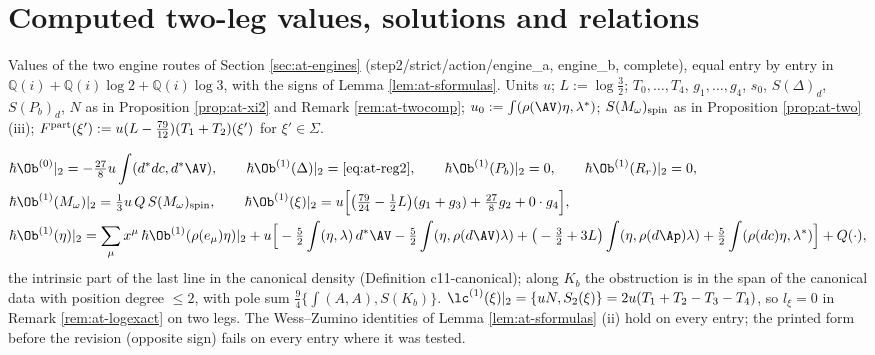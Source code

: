 \section{Computed two-leg values, solutions and relations}
\label{sec:at-computed}

Values of the two engine routes of Section \ref{sec:at-engines} (step2/strict/action/engine\_a, engine\_b, complete), equal entry by entry in $\mathbb Q(i)+\mathbb Q(i)\log2+\mathbb Q(i)\log3$, with the signs of Lemma \ref{lem:at-sformulas}. Units $u$; $L:=\log\tfrac32$; $T_0,\dots,T_4$, $g_1,\dots,g_4$, $s_0$, $S(\Delta)_d$, $S(P_b)_d$, $N$ as in Proposition \ref{prop:at-xi2} and Remark \ref{rem:at-twocomp}; $u_0:=\int(\rho(\AV)\eta,\lambda^*)$; $S(M_\omega)_{\rm spin}$ as in Proposition \ref{prop:at-two} (iii); $F^{\rm part}(\xi'):=u(L-\tfrac{79}{12})(T_1+T_2)(\xi')$ for $\xi'\in\Sigma$.

\begin{proposition}
\label{prop:at-c-ob1}
\[
\begin{aligned}
&\hbar\Ob^{(0)}|_2=-\tfrac{27}8u\int(d^*dc,d^*\AV),\qquad \hbar\Ob^{(1)}(\Delta)|_2=\eqref{eq:at-reg2},\qquad \hbar\Ob^{(1)}(P_b)|_2=0,\qquad \hbar\Ob^{(1)}(R_r)|_2=0,\\
&\hbar\Ob^{(1)}(M_\omega)|_2=\tfrac13u\,Q\,S(M_\omega)_{\rm spin},\qquad \hbar\Ob^{(1)}(\xi)|_2=u\Big[\big(\tfrac{79}{24}-\tfrac12L\big)(g_1+g_3)+\tfrac{27}8g_2+0\cdot g_4\Big],\\
&\hbar\Ob^{(1)}(\eta)|_2=\sum_\mu x^\mu\,\hbar\Ob^{(1)}(\rho(e_\mu)\eta)|_2+u\Big[-\tfrac52\int(\eta,\lambda)\,d^*\AV-\tfrac52\int(\eta,\rho(d\AV)\lambda)+\big(-\tfrac32+3L\big)\int(\eta,\rho(d\Ap)\lambda)+\tfrac52\int(\rho(dc)\eta,\lambda^*)\Big]+Q(\cdot),
\end{aligned}
\]
the intrinsic part of the last line in the canonical density (Definition c11-canonical); along $K_b$ the obstruction is in the span of the canonical data with position degree $\le2$, with pole sum $\tfrac94\{\int(A,A),S(K_b)\}$. $\lc^{(1)}(\xi)|_2=\{uN,S_2(\xi)\}=2u(T_1+T_2-T_3-T_4)$, so $l_\xi=0$ in Remark \ref{rem:at-logexact} on two legs. The Wess--Zumino identities of Lemma \ref{lem:at-sformulas} (ii) hold on every entry; the printed form before the revision (opposite sign) fails on every entry where it was tested.
\end{proposition}

